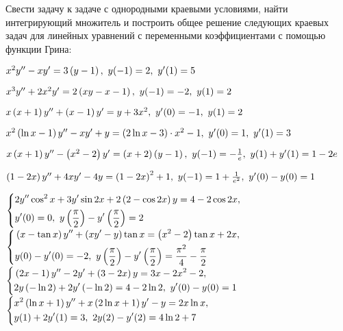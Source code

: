 	Свести задачу к задаче с однородными краевыми условиями, найти интегрирующий множитель и построить общее решение следующих краевых задач для линейных уравнений с переменными коэффициентами с помощью функции Грина:
	\begin{enumtasks}
		
		\label{bvp_green:green_linear}
		\item \( x^2 y'' - xy' = 3 \left( y - 1 \right), ~ y(-1) = 2, ~ y'(1) = 5 \) %
		\item \( x^3 y'' + 2 x^2 y' = 2 \left( xy - x - 1 \right), ~ y(-1) = -2, ~ y(1) = 2 \) %
		\item \( x \left( x + 1 \right) y'' + \left( x - 1 \right) y' = y + 3x^2, ~ y'(0) = -1, ~ y(1) = 2 \) %
		\item \( x^2 \left( \ln{x} - 1 \right) y'' - x y' + y = \left( 2\ln{x} - 3 \right) \cdot x^2 - 1, ~ y'(0) = 1, ~ y'(1) = 3 \) %
		\item \( x \left( x + 1 \right) y'' - \left( x^2 - 2 \right)y' = \left( x + 2 \right) \left( y - 1 \right), ~ y(-1) = -\frac{1}{e}, ~ y(1) + y'(1) = 1 - 2e \) %
		\item \( \left( 1 - 2x \right) y'' + 4xy' - 4y = \left( 1 - 2x \right)^2 + 1, ~ y(-1) = 1 + \frac{1}{e^2}, ~ y'(0) - y(0) = 1 \) %
		
		\label{bvp_green:green_linear_hard}
		\itemstar \( \left\lbrace \begin{aligned} &2 y'' \cos^2{x} + 3y' \sin{2x} + 2 \left( 2 - \cos{2x} \right) y = 4 - 2 \cos{2x}, \\ &y'(0) = 0, ~ y \left( \frac{\pi}{2} \right) - y' \left( \frac{\pi}{2} \right) = 2 \end{aligned} \right. \) %
		\itemstar \( \left\lbrace \begin{aligned} &\left( x - \tan{x} \right) y'' + \left( x y' - y \right) \tan{x} = \left( x^2 - 2 \right) \tan{x} + 2x, \\ &y(0) - y'(0) = -2, ~ y\left( \frac{\pi}{2} \right) - y'\left( \frac{\pi}{2} \right) = \frac{\pi^2}{4} - \frac{\pi}{2} \end{aligned} \right. \) %
		\itemstar \( \left\lbrace \begin{aligned} &\left( 2 x - 1 \right) y'' - 2 y' + \left( 3 - 2x \right) y = 3x - 2x^2 - 2, \\ &2y\left( -\ln{2} \right) + 2y' \left( -\ln{2} \right) = 4 - 2\ln{2}, ~ y'(0) - y(0) = 1 \end{aligned} \right. \) %
		\itemstar \( \left\lbrace \begin{aligned} &x^2 \left( \ln{x} + 1 \right) y'' + x \left( 2 \ln{x} + 1 \right) y' - y = 2x \ln{x}, \\ &y(1) + 2y'(1) = 3, ~ 2y(2) - y'(2) = 4 \ln{2} + 7 \end{aligned} \right. \) %

	\end{enumtasks}

